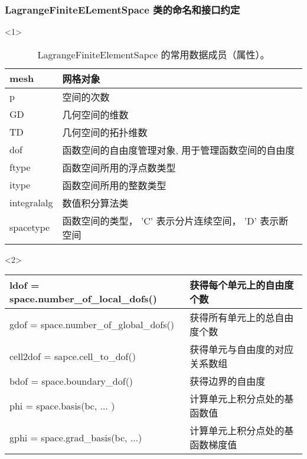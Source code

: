 \documentclass{beamer}
\numberwithin{subsection}{section}
\begin{document}
\begin{frame}
    \frametitle{LagrangeFiniteELementSpace 类的命名和接口约定}
    \begin{onlyenv}<1>
        \begin{table}[H]
            \scriptsize
            \centering
            \begin{tabular}{|l|l|}\hline
                mesh & 网格对象\\\hline
                p    & 空间的次数 \\\hline
                GD   & 几何空间的维数 \\\hline
                TD   & 几何空间的拓扑维数 \\\hline
                dof  & 函数空间的自由度管理对象, 用于管理函数空间的自由度 \\\hline
                ftype & 函数空间所用的浮点数类型 \\\hline
                itype & 函数空间所用的整数类型 \\\hline
                integralalg & 数值积分算法类  \\\hline
                spacetype & 函数空间的类型， 'C' 表示分片连续空间， 'D' 表示断空间\\\hline
            \end{tabular}
            \caption{ LagrangeFiniteElementSapce 的常用数据成员（属性）。}
        \end{table}
    \end{onlyenv}
    \begin{onlyenv}<2>
        \vspace{-0.5cm}
        \begin{table}[H]
            \scriptsize
            \centering
            \begin{tabular}{|l|l|}\hline
                ldof = space.number\_of\_local\_dofs() & 获得每个单元上的自由度个数
                \\\hline
                gdof = space.number\_of\_global\_dofs() & 获得所有单元上的总自由度个数
                \\\hline
                cell2dof = sapce.cell\_to\_dof() & 获得单元与自由度的对应关系数组
                \\\hline
                bdof = space.boundary\_dof() & 获得边界的自由度
                \\\hline
                phi = space.basis(bc, ... )  & 计算单元上积分点处的基函数值
                \\\hline
                gphi = space.grad\_basis(bc, ...) & 计算单元上积分点处的基函数梯度值

\end{tabular}
\end{table}
\end{onlyenv}
\end{frame}
\end{document}
